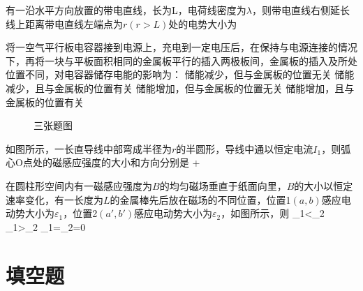 有一沿水平方向放置的带电直线，长为L，电荷线密度为$\lambda$，则带电直线右侧延长线上距离带电直线左端点为$r(r>L)$处的电势大小为
{\ln{}}
{\ln{}}
{\ln{}}

将一空气平行板电容器接到电源上，充电到一定电压后，在保持与电源连接的情况下，再将一块与平板面积相同的金属板平行的插入两极板间，金属板的插入及所处位置不同，对电容器储存电能的影响为：
\options    
{储能减少，但与金属板的位置无关}
{储能减少，且与金属板的位置有关}
{储能增加，但与金属板的位置无关}    
{储能增加，且与金属板的位置有关}

\begin{figure}[!h]
	\centering
	\quad
	\quad
	\caption{三张题图}
\end{figure}

如图所示，一长直导线中部弯成半径为$r$的半圆形，导线中通以恒定电流$I_1$，则弧心O点处的磁感应强度的大小和方向分别是
{+}
{}
{}

在圆柱形空间内有一磁感应强度为$B$的均匀磁场垂直于纸面向里，$B$的大小以恒定速率变化，有一长度为$L$的金属棒先后放在磁场的不同位置，位置1$(a,b)$感应电动势大小为$\varepsilon_1$，位置2$(a',b')$感应电动势大小为$\varepsilon_2$，如图所示，则
{\varepsilon_1<\varepsilon_2}
{\varepsilon_1>\varepsilon_2}
{\varepsilon_1=\varepsilon_2=0}

\section{填空题}

